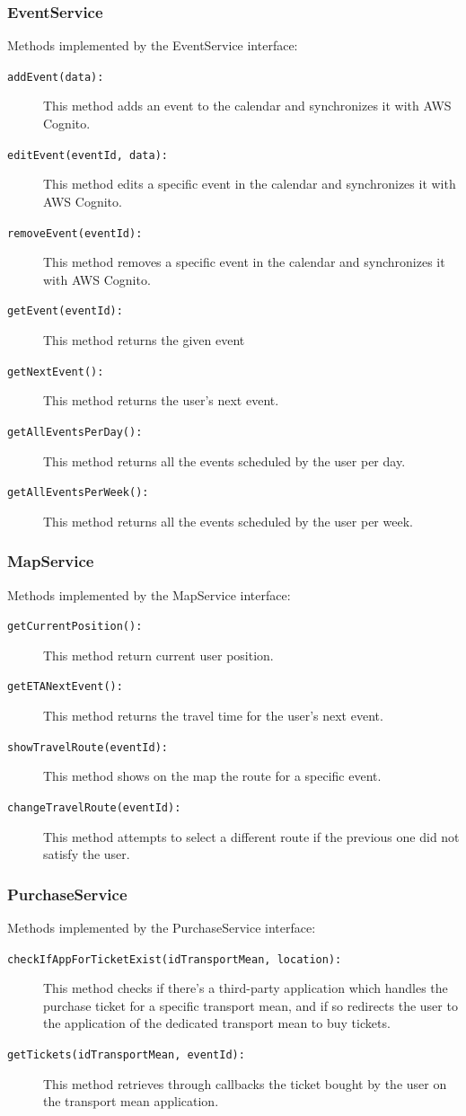 \subsubsection*{EventService}
Methods implemented by the EventService interface:
\begin{description}
	\item[\texttt{addEvent(data):}] This method adds an event to the calendar and synchronizes it with AWS Cognito.
	\item[\texttt{editEvent(eventId, data):}] This method edits a specific event in the calendar and synchronizes it with AWS Cognito.
	\item[\texttt{removeEvent(eventId):}] This method removes a specific event in the calendar and synchronizes it with AWS Cognito.
	\item[\texttt{getEvent(eventId):}] This method returns the given event
	\item[\texttt{getNextEvent():}] This method returns the user's next event.
	\item[\texttt{getAllEventsPerDay():}] This method returns all the events scheduled by the user per day.
	\item[\texttt{getAllEventsPerWeek():}] This method returns all the events scheduled by the user per week.
\end{description}

\subsubsection*{MapService}
Methods implemented by the MapService interface:
\begin{description}
	\item[\texttt{getCurrentPosition():}] This method return current user position.
	\item[\texttt{getETANextEvent():}] This method returns the travel time for the user's next event.
	\item[\texttt{showTravelRoute(eventId):}] This method shows on the map the route for a specific event.
	\item[\texttt{changeTravelRoute(eventId):}] This method attempts to select a different route if the previous one did not satisfy the user.
\end{description}

\subsubsection*{PurchaseService}
Methods implemented by the PurchaseService interface:
\begin{description}
	\item[\texttt{checkIfAppForTicketExist(idTransportMean, location):}] This method checks if there's a third-party application which handles the purchase ticket for a specific transport mean, and if so redirects the user to the application of the dedicated transport mean to buy tickets.
	\item[\texttt{getTickets(idTransportMean, eventId):}] This method retrieves through callbacks the ticket bought by the user on the transport mean application.
\end{description}

